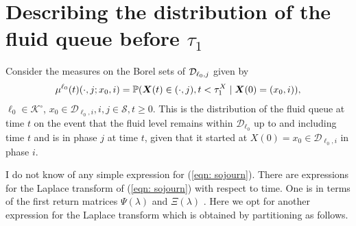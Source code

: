 \section{Describing the distribution of the fluid queue before \(\tau_1\)}\label{sec: no change}
Consider the measures on the Borel sets of \(\mathcal{D}_{\ell_0,j}\) given by
\begin{align}\label{eqn: sojourn}
	\mu^{\ell_0}(t)(\cdot,j; x_0,i) = \mathbb P(\boldsymbol X(t)\in (\cdot ,j), t<\tau_1^X \mid \boldsymbol X(0) = (x_0, i)),
\end{align}
\(\ell_0\in\mathcal K^\circ\), \(x_0 \in\mathcal D_{\ell_0,i}, i,j\in\mathcal S, t \geq 0. \)
This is the distribution of the fluid queue at time \(t\) on the event that the fluid level remains within \(\mathcal D_{\ell_0}\) up to and including time \(t\) and is in phase \(j\) at time \(t\), given that it started at \(X(0)=x_0\in\mathcal D_{\ell_0,i}\) in phase \(i\). 

I do not know of any simple expression for (\ref{eqn: sojourn}). There are expressions for the Laplace transform of (\ref{eqn: sojourn}) with respect to time. One is in terms of the first return matrices \(\Psi(\lambda)\) and \(\Xi(\lambda)\) \citep{bean2009}. Here we opt for another expression for the Laplace transform which is obtained by partitioning as follows.

